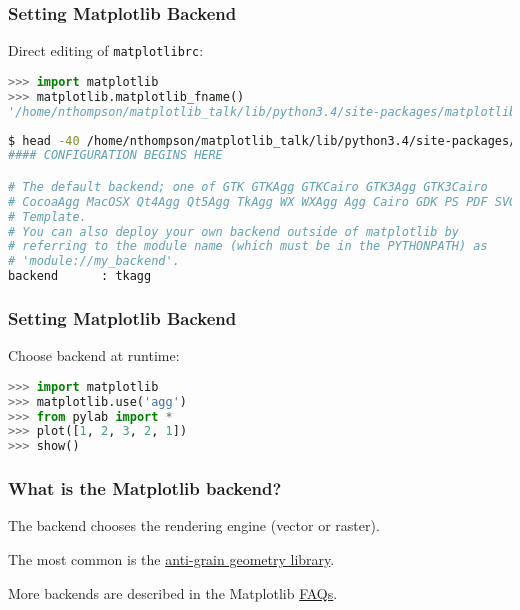 \documentclass{beamer}
\begin{document}
\begin{frame}[fragile]
\frametitle{Setting Matplotlib Backend}
Direct editing of \texttt{matplotlibrc}:
\begin{lstlisting}[language=Python]
>>> import matplotlib
>>> matplotlib.matplotlib_fname()
'/home/nthompson/matplotlib_talk/lib/python3.4/site-packages/matplotlib/mpl-data/matplotlibrc'
\end{lstlisting}
\begin{lstlisting}[language=bash]
$ head -40 /home/nthompson/matplotlib_talk/lib/python3.4/site-packages/matplotlib/mpl-data/matplotlibrc
#### CONFIGURATION BEGINS HERE

# The default backend; one of GTK GTKAgg GTKCairo GTK3Agg GTK3Cairo
# CocoaAgg MacOSX Qt4Agg Qt5Agg TkAgg WX WXAgg Agg Cairo GDK PS PDF SVG
# Template.
# You can also deploy your own backend outside of matplotlib by
# referring to the module name (which must be in the PYTHONPATH) as
# 'module://my_backend'.
backend      : tkagg
\end{lstlisting}
\end{frame}

\begin{frame}[fragile]
\frametitle{Setting Matplotlib Backend}
Choose backend at runtime:
\begin{lstlisting}[language=Python]
>>> import matplotlib
>>> matplotlib.use('agg')
>>> from pylab import *
>>> plot([1, 2, 3, 2, 1])
>>> show()
\end{lstlisting}
\end{frame}

\begin{frame}
\frametitle{What is the Matplotlib backend?}
The backend chooses the rendering engine (vector or raster).

The most common is the \href{http://agg.sourceforge.net/antigrain.com/index.html}{anti-grain geometry library}.

More backends are described in the Matplotlib \href{http://matplotlib.org/faq/usage_faq.html}{FAQs}.

\end{frame}
\end{document}
